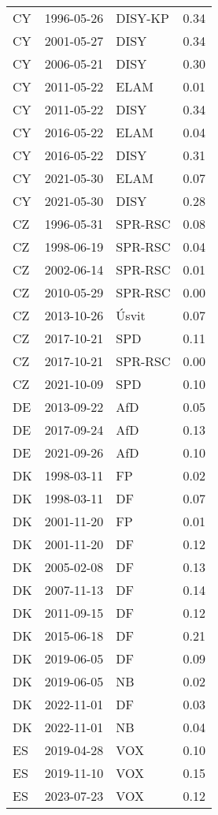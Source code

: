 \begin{longtable}{lllr}
  CY & 1996-05-26 & DISY-KP & 0.34 \\ 
  CY & 2001-05-27 & DISY & 0.34 \\ 
  CY & 2006-05-21 & DISY & 0.30 \\ 
  CY & 2011-05-22 & ELAM & 0.01 \\ 
  CY & 2011-05-22 & DISY & 0.34 \\ 
  CY & 2016-05-22 & ELAM & 0.04 \\ 
  CY & 2016-05-22 & DISY & 0.31 \\ 
  CY & 2021-05-30 & ELAM & 0.07 \\ 
  CY & 2021-05-30 & DISY & 0.28 \\ 
  CZ & 1996-05-31 & SPR-RSC & 0.08 \\ 
  CZ & 1998-06-19 & SPR-RSC & 0.04 \\ 
  CZ & 2002-06-14 & SPR-RSC & 0.01 \\ 
  CZ & 2010-05-29 & SPR-RSC & 0.00 \\ 
  CZ & 2013-10-26 & Úsvit & 0.07 \\ 
  CZ & 2017-10-21 & SPD & 0.11 \\ 
  CZ & 2017-10-21 & SPR-RSC & 0.00 \\ 
  CZ & 2021-10-09 & SPD & 0.10 \\ 
  DE & 2013-09-22 & AfD & 0.05 \\ 
  DE & 2017-09-24 & AfD & 0.13 \\ 
  DE & 2021-09-26 & AfD & 0.10 \\ 
  DK & 1998-03-11 & FP & 0.02 \\ 
  DK & 1998-03-11 & DF & 0.07 \\ 
  DK & 2001-11-20 & FP & 0.01 \\ 
  DK & 2001-11-20 & DF & 0.12 \\ 
  DK & 2005-02-08 & DF & 0.13 \\ 
  DK & 2007-11-13 & DF & 0.14 \\ 
  DK & 2011-09-15 & DF & 0.12 \\ 
  DK & 2015-06-18 & DF & 0.21 \\ 
  DK & 2019-06-05 & DF & 0.09 \\ 
  DK & 2019-06-05 & NB & 0.02 \\ 
  DK & 2022-11-01 & DF & 0.03 \\ 
  DK & 2022-11-01 & NB & 0.04 \\ 
  ES & 2019-04-28 & VOX & 0.10 \\ 
  ES & 2019-11-10 & VOX & 0.15 \\ 
  ES & 2023-07-23 & VOX & 0.12 \\ 

\end{longtable}

